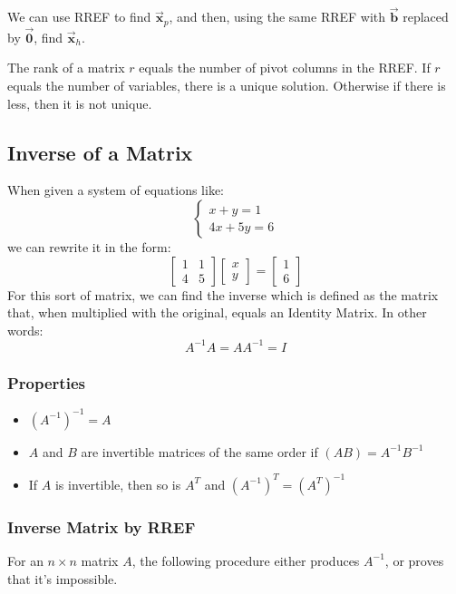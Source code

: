 \documentclass[12pt, landscape, twocolumn]{article}
\let\oldvec\vec
\renewcommand{\vec}[1]{\oldvec{\mathbf{ #1 } } }                    %
\begin{document}
    We can use RREF to find $\vec{x}_p$, and then, using the same RREF with $\vec{b}$ replaced by $\vec{0}$, find $\vec{x}_h$.

    The rank of a matrix $r$ equals the number of pivot columns in the RREF. If $r$ equals the number of variables, there is a unique solution. Otherwise if there is less, then it is not unique.

    \subsection{Inverse of a Matrix}
    When given a system of equations like:
    \[
        \begin{cases}
            x + y = 1\\
            4x + 5y = 6
        \end{cases}
    \]
    we can rewrite it in the form:
    \[
        \left[\begin{array}{cc}
        1 & 1\\
        4 & 5
        \end{array}\right]
        \left[\begin{array}{c}
            x\\
            y
        \end{array}\right] =
        \left[\begin{array}{c}
            1\\
            6
        \end{array}\right]
    \]
    For this sort of matrix, we can find the inverse which is defined as the matrix that, when multiplied with the original, equals an Identity Matrix. In other words:
    \[ A^{-1}A = AA^{-1} = I \]

        \subsubsection{Properties}
        \begin{itemize}
        \item ${( A^{-1})}^{-1} = A$
        \item $A$ and $B$ are invertible matrices of the same order if $\left(AB\right) = A^{-1}B^{-1}$
        \item If $A$ is invertible, then so is $A^T$ and $\left(A^{-1}\right)^T = \left(A^T\right)^{-1}$
        \end{itemize}

        \subsubsection{Inverse Matrix by RREF}
        For an $n\times n$ matrix $A$, the following procedure either produces $A^{-1}$, or proves that it's impossible.
\end{document}
